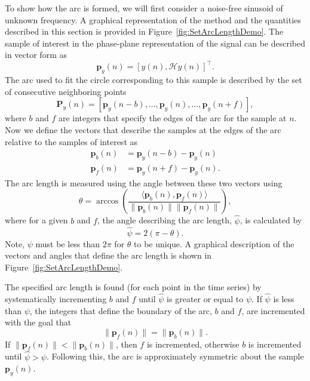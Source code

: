 \documentclass[a4paper]{IEEEtran}
\begin{document}
To show how the arc is formed, we will first consider a noise-free sinusoid of unknown frequency. A graphical representation of the method and the quantities described in this section is provided in Figure~\ref{fig:SetArcLengthDemo}. The sample of interest in the phase-plane representation of the signal can be described in vector form as
\begin{equation}
	\mathbf{p}_y(n) = \left[y\left(n\right),\mathcal{H}y\left(n\right)\right]^{\top}.
\end{equation}
The arc used to fit the circle corresponding to this sample is described by the set of consecutive neighboring points
\begin{equation}
	\mathbf{P}_y(n) = \left[\mathbf{p}_y(n-b),\hdots,\mathbf{p}_y(n),\hdots,\mathbf{p}_y(n+f)\right],
\end{equation}
where $b$ and $f$ are integers that specify the edges of the arc for the sample at $n$. Now we define the vectors that describe the samples at the edges of the arc relative to the samples of interest as
\begin{align}
	\mathbf{p}_b(n) &= \mathbf{p}_y(n-b)-\mathbf{p}_y(n) \\
	\mathbf{p}_f(n) &= \mathbf{p}_y(n+f)-\mathbf{p}_y(n).
\end{align}
The arc length is measured using the angle between these two vectors using
\begin{equation}
	\theta = \arccos\left(\frac{\langle\mathbf{p}_b(n),\mathbf{p}_f(n)\rangle}{\|\mathbf{p}_b(n)\| \|\mathbf{p}_f(n)\|}\right),
\end{equation}
where for a given $b$ and $f$, the angle describing the arc length, $\hat\psi$, is calculated by
\begin{equation}\label{eq:theta_2_psi}
	\hat\psi = 2(\pi-\theta).
\end{equation}
Note, $\psi$ must be less than $2\pi$ for $\theta$ to be unique. A graphical description of the vectors and angles that define the arc length is shown in Figure~\ref{fig:SetArcLengthDemo}.

The specified arc length is found (for each point in the time series) by systematically incrementing $b$ and $f$ until $\hat\psi$ is greater or equal to $\psi$. If $\hat\psi$ is less than $\psi$, the integers that define the boundary of the arc, $b$ and $f$, are incremented with the goal that
\begin{equation}\label{eq:balanced_distances}
	\|\mathbf{p}_f(n)\| = \|\mathbf{p}_b(n)\|.
\end{equation}
If $\|\mathbf{p}_f(n)\| < \|\mathbf{p}_b(n)\|$, then $f$ is incremented, otherwise $b$ is incremented until $\hat\psi > \psi$. Following this, the arc is approximately symmetric about the sample $\mathbf{p}_y(n)$. 
\end{document}
